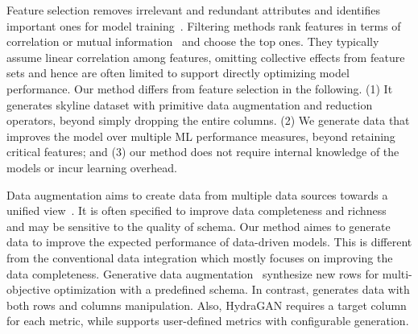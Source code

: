  Feature selection removes irrelevant and redundant attributes and identifies important ones for model training~\cite{li2017feature}. Filtering methods rank features in terms of correlation or mutual information~\cite{peng2005feature, nguyen2014effective} and choose the top ones. They typically assume  
linear correlation among features, omitting collective 
effects from feature sets and hence are often 
limited to support directly optimizing 
model performance. 
Our method differs from 
feature selection in the following. 
(1) It generates skyline dataset with primitive data augmentation and reduction operators, 
beyond simply dropping the entire columns. 
(2) We generate data that improves the model over multiple ML performance measures, beyond retaining critical features;  
and (3) our method does not require internal knowledge of the models or incur learning overhead. 

 Data augmentation aims to create data from multiple data sources 
towards a unified view~\cite{doan2012principles, ziegler2007data,roh2019survey,esmailoghli2023blend}. It is often specified 
to improve data completeness and richness~\cite{roh2019survey}
and may be sensitive to the quality of schema.  
Our method aimes to generate data to improve the expected performance of  data-driven models. This is different from the conventional data integration which mostly focuses on improving the data completeness.
Generative data augmentation~\cite{desmet2024hydragan} synthesize new rows for multi-objective optimization with a predefined schema. In contrast, \modis generates data with both rows and columns manipulation.  %
Also, HydraGAN requires a target column for each metric, while \modis supports user-defined metrics with configurable generation. 



